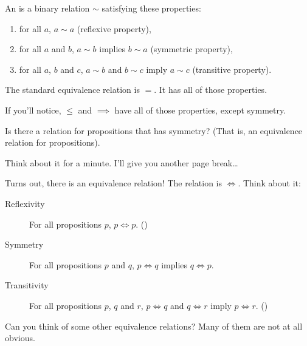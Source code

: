 \begin{definition}
  An  is a binary relation $\sim$ satisfying
  these properties:

  \begin{enumerate}
  \item for all $a$, $a \sim a$ (reflexive property),
  \item for all $a$ and $b$, $a \sim b$ implies $b \sim a$ (symmetric
    property),
  \item for all $a$, $b$ and $c$, $a \sim b$ and $b \sim c$ imply
    $a \sim c$ (transitive property).
  \end{enumerate}
\end{definition}

The standard equivalence relation is $=$. It has all of those
properties.

If you'll notice, $\le$ and $\implies$ have all of those properties,
except symmetry.

Is there a relation for propositions that has symmetry? (That is, an
equivalence relation for propositions).

Think about it for a minute. I'll give you another page break\dots

\newpage

Turns out, there is an equivalence relation! The relation is
$\iff$. Think about it:

\begin{description}
\item[Reflexivity] For all propositions $p$, $p \iff
  p$. ()
\item[Symmetry] For all propositions $p$ and $q$, $p \iff q$ implies
  $q \iff p$.
\item[Transitivity] For all propositions $p$, $q$ and $r$, $p \iff q$
  and $q \iff r$ imply $p \iff r$. ()
\end{description}

Can you think of some other equivalence relations? Many of them are
not at all obvious.

